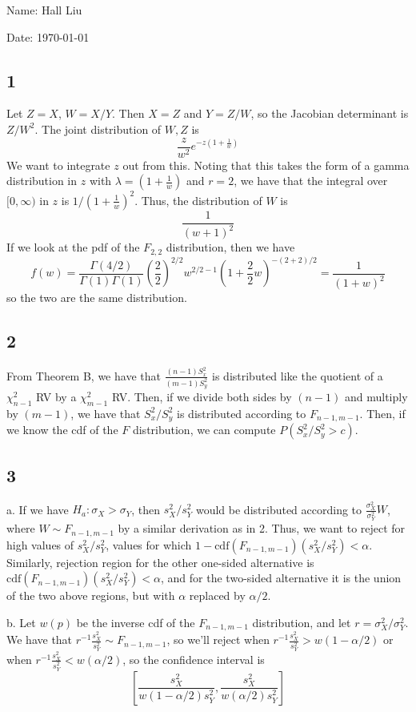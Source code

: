 \documentclass{article}
\begin{document}
Name: Hall Liu

Date: \today 
\vspace{1.5cm}

\subsection*{1}
Let $Z=X$, $W=X/Y$. Then $X=Z$ and $Y=Z/W$, so the Jacobian determinant is $Z/W^2$. The joint distribution of $W,Z$ is 
$$\frac{z}{w^2}e^{-z(1+\frac{1}{w})}$$
We want to integrate $z$ out from this. Noting that this takes the form of a gamma distribution in $z$ with $\lambda=(1+\frac{1}{w})$ and $r=2$, we have that the integral over $[0,\infty)$ in $z$ is $1/(1+\frac{1}{w})^2$. Thus, the distribution of $W$ is
$$\frac{1}{(w+1)^2}$$
If we look at the pdf of the $F_{2,2}$ distribution, then we have 
$$f(w)=\frac{\Gamma(4/2)}{\Gamma(1)\Gamma(1)}\left(\frac{2}{2}\right)^{2/2}w^{2/2-1}\left(1+\frac{2}{2}w\right)^{-(2+2)/2}=\frac{1}{(1+w)^2}$$
so the two are the same distribution.
\subsection*{2}
From Theorem B, we have that $\frac{(n-1)S_x^2}{(m-1)S_y^2}$ is distributed like the quotient of a $\chi_{n-1}^2$ RV by a $\chi_{m-1}^2$ RV. Then, if we divide both sides by $(n-1)$ and multiply by $(m-1)$, we have that $S_x^2/S_y^2$ is distributed according to $F_{n-1,m-1}$. Then, if we know the cdf of the $F$ distribution, we can compute $P(S_x^2/S_y^2>c)$.
\subsection*{3}
a. If we have $H_a:\sigma_X>\sigma_Y$, then $s_X^2/s_Y^2$ would be distributed according to $\frac{\sigma_X^2}{\sigma_Y^2}W$, where $W\sim F_{n-1,m-1}$ by a similar derivation as in 2. Thus, we want to reject for high values of $s_X^2/s_Y^2$, values for which $1-\text{cdf}(F_{n-1,m-1})(s_X^2/s_Y^2)<\alpha$. Similarly, rejection region for the other one-sided alternative is $\text{cdf}(F_{n-1,m-1})(s_X^2/s_Y^2)<\alpha$, and for the two-sided alternative it is the union of the two above regions, but with $\alpha$ replaced by $\alpha/2$. 

\noindent b. Let $w(p)$ be the inverse cdf of the $F_{n-1,m-1}$ distribution, and let $r=\sigma_X^2/\sigma_Y^2$. We have that $r^{-1}\frac{s_X^2}{s_Y^2}\sim F_{n-1,m-1}$, so we'll reject when $r^{-1}\frac{s_X^2}{s_Y^2}>w(1-\alpha/2)$ or when $r^{-1}\frac{s_X^2}{s_Y^2}<w(\alpha/2)$, so the confidence interval is $$\left[\frac{s_X^2}{w(1-\alpha/2)s_Y^2},\frac{s_X^2}{w(\alpha/2)s_Y^2}\right]$$
\end{document}
